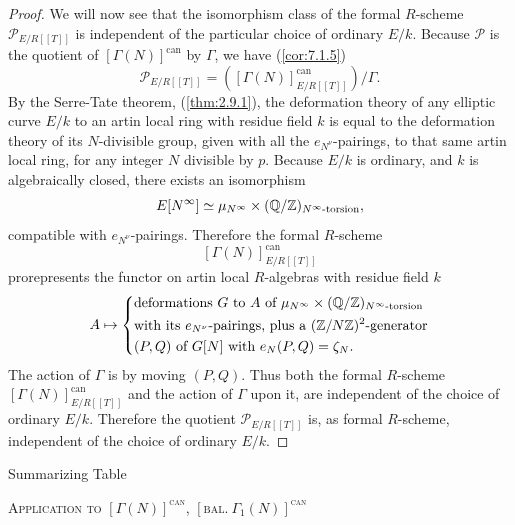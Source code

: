 \begin{proof}
\par
We will now see that the isomorphism class of the formal $R$-scheme $\mathcal{P}_{E/R[[T]]}$ is independent of the particular choice of ordinary $E/k$. Because $\mathcal{P}$ is the quotient of $[\Gamma(N)]^{\mathrm{can}}$ by $\Gamma$, we have (\ref{cor:7.1.5})
\[
\mathcal{P}_{E/R[[T]]} = ([\Gamma(N)]^{\mathrm{can}}_{E/R[[T]]})/\Gamma .
\]
By the Serre-Tate theorem, (\ref{thm:2.9.1}), the deformation theory of any elliptic curve $E/k$ to an artin local ring with residue field $k$ is equal to the deformation theory of its $N$-divisible group, given with all the $e_{N^\nu}$-pairings, to that same artin local ring, for any integer $N$ divisible by $p$. Because $E/k$ is ordinary, and $k$ is algebraically closed, there exists an isomorphism
\[
E[N^\infty] \simeq \mu_{N^\infty} \times (\mathbb{Q}/\mathbb{Z})_{N^\infty\text{-torsion}} ,
\]
compatible with $e_{N^\nu}$-pairings. Therefore the formal $R$-scheme
\[
[\Gamma(N)]^{\mathrm{can}}_{E/R[[T]]}
\]
prorepresents the functor on artin local $R$-algebras with residue field $k$
\[
A \mapsto \left\{
\begin{aligned}
&\text{deformations $G$ to $A$ of $\mu_{N^\infty} \times (\mathbb{Q}/\mathbb{Z})_{N^\infty\text{-torsion}}$} \\
&\text{with its $e_{N^\nu}$-pairings, plus a $(\mathbb{Z}/N\mathbb{Z})^2$-generator} \\
&\text{$(P,Q)$ of $G[N]$ with $e_N(P,Q) = \zeta_N$.}
\end{aligned}
\right.
\]
The action of $\Gamma$ is by moving $(P,Q)$. Thus both the formal $R$-scheme $[\Gamma(N)]^{\mathrm{can}}_{E/R[[T]]}$ and the action of $\Gamma$ upon it, are independent of the choice of ordinary $E/k$. Therefore the quotient $\mathcal{P}_{E/R[[T]]}$ is, as formal $R$-scheme, independent of the choice of ordinary $E/k$.
\end{proof}

\kmitem\label{item:10.9.3}Summarizing Table

\begin{center}
{\scshape Application to $[\Gamma(N)]^{\mathrm{can}}$, $[\mathrm{bal.}\ \Gamma_1(N)]^{\mathrm{can}}$}
\end{center}

